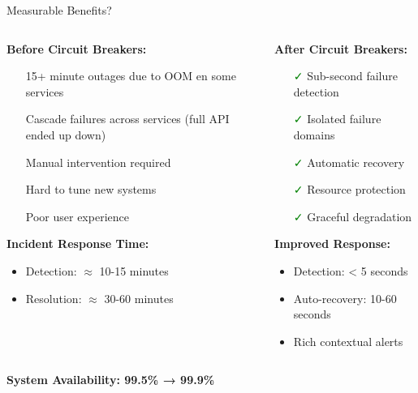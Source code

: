 \documentclass[aspectratio=169]{beamer}
\newcommand{\alertred}[1]{\textcolor{red}{#1}}
\newcommand{\successgreen}[1]{\textcolor{green}{#1}}
\begin{document}
\begin{frame}{Measurable Benefits?}
    \begin{columns}
        \begin{column}{0.5\textwidth}
            \textbf{Before Circuit Breakers:}
            \begin{itemize}
                \item[\alertred{\faTimes}] 15+ minute outages due to OOM en some services
                \item[\alertred{\faTimes}] Cascade failures across services (full API ended up down)
                \item[\alertred{\faTimes}] Manual intervention required
                \item[\alertred{\faTimes}] Hard to tune new systems
                \item[\alertred{\faTimes}] Poor user experience
            \end{itemize}
            
            \vspace{0.5cm}
            \textbf{Incident Response Time:}
            \begin{itemize}
                \item Detection: $\approx$ 10-15 minutes
                \item Resolution: $\approx$  30-60 minutes
            \end{itemize}
        \end{column}
        \begin{column}{0.5\textwidth}
            \textbf{After Circuit Breakers:}
            \begin{itemize}
                \item[\successgreen{\faCheck}] Sub-second failure detection
                \item[\successgreen{\faCheck}] Isolated failure domains
                \item[\successgreen{\faCheck}] Automatic recovery
                \item[\successgreen{\faCheck}] Resource protection
                \item[\successgreen{\faCheck}] Graceful degradation
            \end{itemize}
            
            \vspace{0.5cm}
            \textbf{Improved Response:}
            \begin{itemize}
                \item Detection: < 5 seconds
                \item Auto-recovery: 10-60 seconds
                \item Rich contextual alerts
            \end{itemize}
        \end{column}
    \end{columns}
    
    \vspace{0.5cm}
    \begin{center}
        \textbf{System Availability: 99.5\% → 99.9\%}
    \end{center}
\end{frame}
\end{document}
